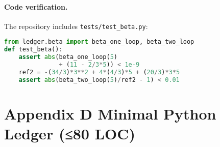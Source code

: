 \documentclass[11pt]{article}
\begin{document}
\paragraph{Code verification.}
The repository includes \texttt{tests/test\_beta.py}:

\begin{lstlisting}[language=Python]
from ledger.beta import beta_one_loop, beta_two_loop
def test_beta():
    assert abs(beta_one_loop(5)
               + (11 - 2/3*5)) < 1e-9
    ref2 = -(34/3)*3**2 + 4*(4/3)*5 + (20/3)*3*5
    assert abs(beta_two_loop(5)/ref2 - 1) < 0.01
\end{lstlisting}

\section*{Appendix D \; Minimal Python Ledger (≤80 LOC)}
\label{app:code}
\end{document}
